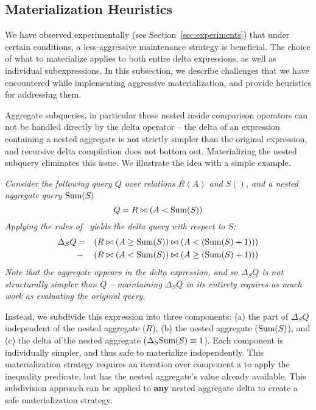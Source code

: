 \subsection{Materialization Heuristics}
\label{sec:advanced-rewriting}

We have observed experimentally (see Section~\ref{sec:experiments}) that under certain conditions, a less-aggressive maintenance strategy is beneficial.  The choice of what to materialize applies to both entire delta expressions, as well as individual subexpressions.  In this subsection, we describe challenges that we have encountered while implementing aggressive materialization, and provide heuristics for addressing them.

Aggregate subqueries, in particular those nested inside comparison operators can not be handled directly by the delta operator -- the delta of an expression containing a nested aggregate is not strictly simpler than the original expression, and recursive delta compilation does not bottom out.  Materializing the nested subquery eliminates this issue.  We illustrate the idea with a simple example.

\begin{example} \em
Consider the following query $Q$ over relations $R(A)$ and $S()$, and a nested aggregate query $\mbox{Sum}(S)$
\vspace*{-0.05in}
{\small $$Q = R \bowtie (A < \mbox{Sum}(S))$$}
Applying the rules of~\cite{koch-pods:10} yields the delta query with respect to $S$:
{\small \begin{eqnarray*}
\Delta_SQ & =  & (R \bowtie (A \geq \mbox{Sum}(S)) \bowtie (A < (\mbox{Sum}(S) +1)))\\
&-& (R \bowtie (A <  \mbox{Sum}(S)) \bowtie (A \geq (\mbox{Sum}(S) + 1)))
\end{eqnarray*}}
Note that the aggregate appears in the delta expression, and so $\Delta_SQ$ is not structurally simpler than $Q$ -- maintaining $\Delta_S Q$ in its entirety requires as much work as evaluating the original query.  

Instead, we subdivide this expression into three components: (a) the part of $\Delta_S Q$ independent of the nested aggregate ($R$), (b) the nested aggregate ($\mbox{Sum}(S)$), and (c) the delta of the nested aggregate ($\Delta_S\mbox{Sum}(S) \equiv 1$).  Each component is individually simpler, and thus safe to materialize independently.  This materialization strategy requires an iteration over component a to apply the inequality predicate, but has the nested aggregate's value already available.  This subdivision approach can be applied to {\bf any} nested aggregate delta to create a safe materialization strategy.
\end{example}

